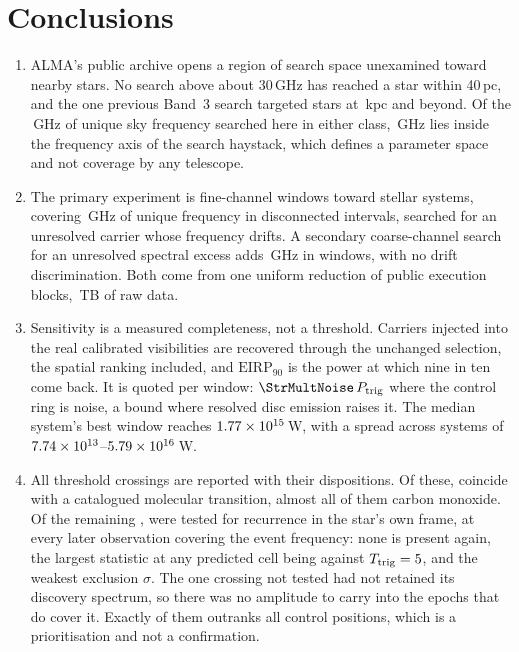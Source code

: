 \section{Conclusions}
\label{sec:conclusions}

\begin{enumerate}[leftmargin=1.6em,itemsep=4pt,topsep=4pt,parsep=0pt]

\item ALMA's public archive opens a region of search space unexamined
toward nearby stars. No search above about 30\,GHz has reached a
star within 40\,pc, and the one previous Band~3 search targeted stars at
\MasonNearKpc\,kpc and beyond. Of the \UnionGHz\,GHz of unique sky
frequency searched here in either class, \UnionBandThree\,GHz lies inside
the frequency axis of the \citet{Wright2018} search haystack, which defines a parameter
space and not coverage by any telescope.

\item The primary experiment is \NWinA{} fine-channel windows toward
\NSysClassA{} stellar systems, covering \DnuA\,GHz of unique frequency in
disconnected intervals, searched for an unresolved carrier whose frequency
drifts. A secondary coarse-channel search for an unresolved spectral excess
adds \DnuBonly\,GHz in \NWinB{} windows, with no drift discrimination. Both
come from one uniform reduction of \NEB{} public execution blocks,
\TotalDataTB\,TB of raw data.

\item Sensitivity is a measured completeness, not a threshold. Carriers
injected into the real calibrated visibilities are recovered through the
unchanged selection, the spatial ranking included, and
$\mathrm{EIRP}_{90}$ is the power at which nine in ten come back. It is
quoted per window: $\StrMultNoise\,P_{\rm trig}$ where the control ring is
noise, a bound where resolved disc emission raises it. The median system's
best window reaches $1.77\times10^{15}$\,W, with a spread across systems
of $7.74\times10^{13}$--$5.79\times10^{16}$\,W.

\item All \NCross{} threshold crossings are reported with their
dispositions. Of these, \NAttributed{} coincide with a catalogued molecular
transition, almost all of them carbon monoxide. Of the remaining
\NUnattributed{}, \RcNTested{}
were tested for recurrence in the star's own frame, at every later
observation covering the event frequency: none is present again, the largest
statistic at any predicted cell being \RcTMax{} against
$T_{\rm trig}=5$, and the weakest exclusion \RcExclMin$\sigma$.
The one crossing not tested had not retained its discovery spectrum, so
there was no amplitude to carry into the epochs that do cover it. Exactly
\NUnattrRankFlagged{} of them
outranks all \NCtrl{} control positions, which is a prioritisation and not
a confirmation.


\end{enumerate}
